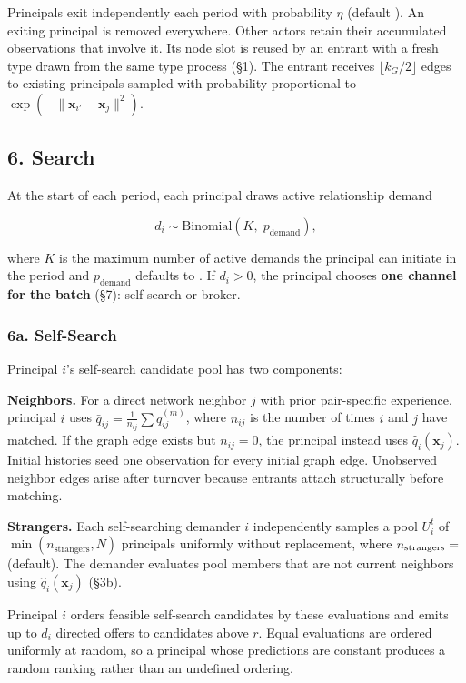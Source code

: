 \documentclass[11pt]{article}
\begin{document}
Principals exit independently each period with probability \(\eta\) (default ). An exiting principal is removed everywhere. Other actors retain their accumulated observations that involve it. Its node slot is reused by an entrant with a fresh type drawn from the same type process (§1). The entrant receives \(\lfloor k_G/2 \rfloor\) edges to existing principals sampled with probability proportional to \(\exp(-\|\mathbf{x}_{i'} - \mathbf{x}_j\|^2)\).

\subsection{6. Search}\label{search}

At the start of each period, each principal draws active relationship demand

\[d_i \sim \text{Binomial}(K,\; p_{\text{demand}}),\]

where \(K\) is the maximum number of active demands the principal can initiate in the period and \(p_{\text{demand}}\) defaults to . If \(d_i > 0\), the principal chooses \textbf{one channel for the batch} (§7): self-search or broker.

\subsubsection{6a. Self-Search}\label{a.-self-search}

Principal \(i\)'s self-search candidate pool has two components:

\textbf{Neighbors.} For a direct network neighbor \(j\) with prior pair-specific experience, principal \(i\) uses \(\bar{q}_{ij} = \frac{1}{n_{ij}} \sum q_{ij}^{(m)}\), where \(n_{ij}\) is the number of times \(i\) and \(j\) have matched. If the graph edge exists but \(n_{ij}=0\), the principal instead uses \(\hat q_i(\mathbf x_j)\). Initial histories seed one observation for every initial graph edge. Unobserved neighbor edges arise after turnover because entrants attach structurally before matching.

\textbf{Strangers.} Each self-searching demander \(i\) independently samples a pool \(U_i^t\) of \(\min(n_{\mathrm{strangers}}, N)\) principals uniformly without replacement, where \(n_{\mathrm{strangers}} = \pv{settingn_strangers}\) (default). The demander evaluates pool members that are not current neighbors using \(\hat{q}_i(\mathbf{x}_j)\) (§3b).

Principal \(i\) orders feasible self-search candidates by these evaluations and emits up to \(d_i\) directed offers to candidates above \(r\). Equal evaluations are ordered uniformly at random, so a principal whose predictions are constant produces a random ranking rather than an undefined ordering.
\end{document}
